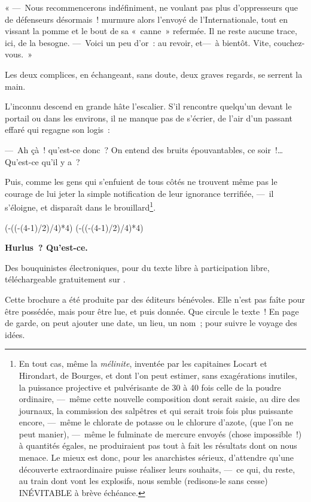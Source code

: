 \documentclass[french,twoside]{book} %
\def\truncdiv#1#2{((#1-(#2-1)/2)/#2)}
\def\moduloop#1#2{(#1-\truncdiv{#1}{#2}*#2)}
\def\modulo#1#2{\number\numexpr\moduloop{#1}{#2}\relax}
\begin{document}
« — Nous recommencerons indéfiniment, ne voulant pas plus d’oppresseurs que de défenseurs désormais ! murmure alors l’envoyé de l’Internationale, tout en vissant la pomme et le bout de sa « canne » refermée. Il ne reste aucune trace, ici, de la besogne. — Voici un peu d’or : au revoir, et— à bientôt. Vite, couchez-vous. »\par
Les deux complices, en échangeant, sans doute, deux graves regards, se serrent la main.\par
L’inconnu descend en grande hâte l’escalier. S’il rencontre quelqu’un devant le portail ou dans les environs, il ne manque pas de s’écrier, de l’air d’un passant effaré qui regagne son logis :\par
— Ah çà ! qu’est-ce donc ? On entend des bruits épouvantables, ce soir !… Qu’est-ce qu’il y a ?\par
Puis, comme les gens qui s’enfuient de tous côtés ne trouvent même pas le courage de lui jeter la simple notification de leur ignorance   terrifiée, — il s’éloigne, et disparaît dans le brouillard\footnote{En tout cas, même la \emph{mélinite}, inventée par les capitaines Locart et Hirondart, de Bourges, et dont l’on peut estimer, sans exagérations inutiles, la puissance projective et pulvérisante de 30 à 40 fois celle de la poudre ordinaire, — même cette nouvelle composition dont serait saisie, au dire des journaux, la commission des salpêtres et qui serait trois fois plus puissante encore, — même le chlorate de potasse ou le chlorure d’azote, (que l’on ne peut manier), — même le fulminate de mercure envoyés (chose impossible !) à quantités égales, ne produiraient pas tout à fait les résultats dont on nous menace. Le mieux est donc, pour les anarchistes sérieux, d’attendre qu’une découverte extraordinaire puisse réaliser leurs souhaits, — ce qui, du reste, au train dont vont les explosifs, nous semble (redisons-le sans cesse) INÉVITABLE à brève échéance.}.
 


\ifbooklet
  \pagestyle{empty}
  \clearpage
  \ifnum\modulo{\value{page}}{4}=0 \hbox{}\newpage\hbox{}\newpage\fi
  \ifnum\modulo{\value{page}}{4}=1 \hbox{}\newpage\hbox{}\newpage\fi


  \hbox{}\newpage
  \ifodd\value{page}\hbox{}\newpage\fi
  {\centering\color{rubric}\bfseries\noindent\large
    Hurlus ? Qu’est-ce.\par
    \bigskip
  }
  \noindent Des bouquinistes électroniques, pour du texte libre à participation libre,
  téléchargeable gratuitement sur \href{https://hurlus.fr}{}.\par
  \bigskip
  \noindent Cette brochure a été produite par des éditeurs bénévoles.
  Elle n’est pas faîte pour être possédée, mais pour être lue, et puis donnée.
  Que circule le texte !
  En page de garde, on peut ajouter une date, un lieu, un nom ; pour suivre le voyage des idées.
  \par
\end{document}
